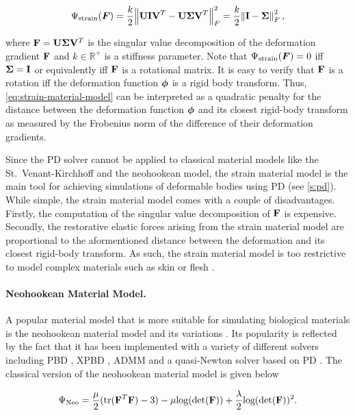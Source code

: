 \begin{equation}\label{eq:strain-material-model}
    \Psi_{\text{strain}}(\bm{F}) = \frac{k}{2} \norm{\mathbf{U}\mathbf{I}\mathbf{V}^T - \mathbf{U}\mathbf{\Sigma}\mathbf{V}^T}^2_F 
    = \frac{k}{2} \norm{\mathbf{I} - \mathbf{\Sigma}}^2_F,
\end{equation}

\noindent where $\mathbf{F} = \mathbf{U}\mathbf{\Sigma}\mathbf{V}^T$ is the singular value decomposition of the deformation gradient $\mathbf{F}$ and $k 
\in \mathbb{R}^+$ is a stiffness parameter. Note that $\Psi_{\text{strain}}(\bm{F}) = 0$ iff $\mathbf{\Sigma} = \mathbf{I}$ or equivalently iff 
$\mathbf{F}$ is a rotational matrix. It is easy to verify that $\mathbf{F}$ is a rotation iff the deformation function $\bm{\phi}$ is a rigid body 
transform. Thus, \autoref{eq:strain-material-model} can be interpreted as a quadratic penalty for the distance between the 
deformation function $\bm{\phi}$ and its closest rigid-body transform as measured by the Frobenius norm of the difference of their deformation 
gradients. 

Since the PD solver cannot be applied to classical material models like the St.\ Venant-Kirchhoff and the neohookean model, the strain 
material model is the main tool for achieving simulations of deformable bodies using PD (see \cref{s:pd}).
While simple, the strain material model comes with a couple of disadvantages. Firstly, the computation of the singular value decomposition of 
$\mathbf{F}$ is expensive. Secondly, the restorative elastic forces arising from the strain material model are proportional 
to the aformentioned distance between the deformation and its closest rigid-body transform. As such, the strain material model is too 
restrictive to model complex materials such as skin or flesh \cite{liu2017}. 

\paragraph{Neohookean Material Model.}
A popular material model that is more suitable for simulating biological materials is the neohookean material model and its variations 
\cite{smith2018}. Its popularity is reflected by the fact that it has been implemented with a variety of different solvers including 
PBD \cite{bender2014}, XPBD \cite{macklin2021}, ADMM \cite{overby2017} and a quasi-Newton solver based on PD \cite{liu2017}.
The classical version of the neohookean material model is given below

\begin{equation}\label{eq:neohookean-material-model}
    \Psi_{\text{Neo}} = \frac{\mu}{2}(\text{tr}(\mathbf{F}^T\mathbf{F}) - 3) - \mu \text{log}(\text{det}(\mathbf{F})) 
    + \frac{\lambda}{2}\text{log}(\text{det}(\mathbf{F}))^2.
\end{equation}

